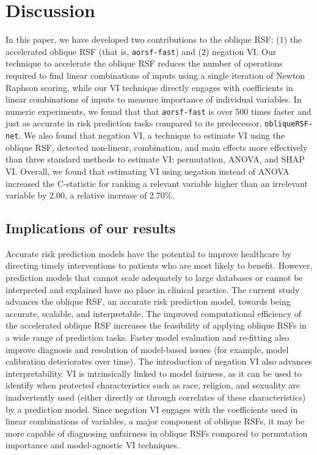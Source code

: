 \documentclass[twoside,11pt]{article}\usepackage[]{graphicx}\usepackage[]{xcolor}
\newcommand{\ie}{that is}
\newcommand{\eg}{for example}
\begin{document}
\section{Discussion}

In this paper, we have developed two contributions to the oblique RSF: (1) the accelerated oblique RSF (\ie, \texttt{aorsf-fast}) and (2) negation VI. Our technique to accelerate the oblique RSF reduces the number of operations required to find linear combinations of inputs using a single iteration of Newton Raphson scoring, while our VI technique directly engages with coefficients in linear combinations of inputs to measure importance of individual variables. In numeric experiments, we found that that \texttt{aorsf-fast} is over 500 times faster and just as accurate in risk prediction tasks compared to its predecessor, \texttt{obliqueRSF-net}. We also found that negation VI, a technique to estimate VI using the oblique RSF, detected non-linear, combination, and main effects more effectively than three standard methods to estimate VI: permutation, ANOVA, and SHAP VI. Overall, we found that estimating VI using negation instead of ANOVA increased the C-statistic for ranking a relevant variable higher than an irrelevant variable by 2.00, a relative increase of 2.70\%.

\subsection{Implications of our results}

Accurate risk prediction models have the potential to improve healthcare by directing timely interventions to patients who are most likely to benefit. However, prediction models that cannot scale adequately to large databases or cannot be interpreted and explained have no place in clinical practice. The current study advances the oblique RSF, an accurate risk prediction model, towards being accurate, scalable, and interpretable. The improved computational efficiency of the accelerated oblique RSF increases the feasibility of applying oblique RSFs in a wide range of prediction tasks. Faster model evaluation and re-fitting also improve diagnosis and resolution of model-based issues (\eg, model calibration deteriorates over time). The introduction of negation VI also advances interpretability. VI is intrinsically linked to model fairness, as it can be used to identify when protected characteristics such as race, religion, and sexuality are inadvertently used (either directly or through correlates of these characteristics) by a prediction model. Since negation VI  engages with the coefficients used in linear combinations of variables, a major component of oblique RSFs, it may be more capable of diagnosing unfairness in oblique RSFs compared to permutation importance and model-agnostic VI techniques.
\end{document}

